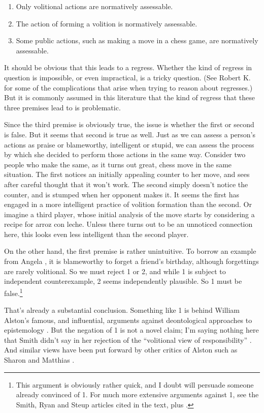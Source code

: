 \begin{enumerate}
\item Only volitional actions are normatively assessable.
\item The action of forming a volition is normatively assessable.
\item Some public actions, such as making a move in a chess game, are normatively assessable.
\end{enumerate}
%
It should be obvious that this leads to a regress. Whether the kind of regress in question is impossible, or even impractical, is a tricky question. (See Robert K. \citet{Meyer1987} for some of the complications that arise when trying to reason about regresses.) But it is commonly assumed in this literature that the kind of regress that these three premises lead to is problematic.

Since the third premise is obviously true, the issue is whether the first or second is false. But it seems that second is true as well. Just as we can assess a person's actions as praise or blameworthy, intelligent or stupid, we can assess the process by which she decided to perform those actions in the same way. Consider two people who make the same, as it turns out great, chess move in the same situation. The first notices an initially appealing counter to her move, and sees after careful thought that it won't work. The second simply doesn't notice the counter, and is stumped when her opponent makes it. It seems the first has engaged in a more intelligent practice of volition formation than the second. Or imagine a third player, whose initial analysis of the move starts by considering a recipe for arroz con leche. Unless there turns out to be an unnoticed connection here, this looks even less intelligent than the second player.

On the other hand, the first premise is rather unintuitive. To borrow an example from Angela \citet{AngelaSmith2005}, it is blameworthy to forget a friend's birthday, although forgettings are rarely volitional. So we must reject 1 or 2, and while 1 is subject to independent counterexample, 2 seems independently plausible. So 1 must be false.\footnote{This argument is obviously rather quick, and I doubt will persuade someone already convinced of 1. For much more extensive arguments against 1, see the Smith, Ryan and Steup articles cited in the text, plus \citet{Adams1985}.}

That's already a substantial conclusion. Something like 1 is behind William Alston's famous, and influential, arguments against deontological approaches to epistemology \citep{Alston1988}. But the negation of 1 is not a novel claim; I'm saying nothing here that Smith didn't say in her rejection of the ``volitional view of responsibility'' \citep[238]{AngelaSmith2005}. And similar views have been put forward by other critics of Alston such as Sharon \citet{Ryan2003} and Matthias \citet{Steup2008}. 

